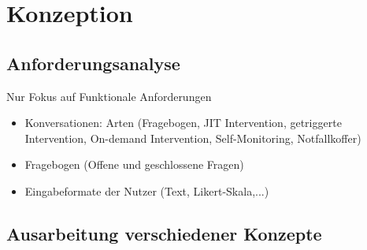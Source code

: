 \chapter{Konzeption}
\label{ch:Design}

\section{Anforderungsanalyse}

Nur Fokus auf Funktionale Anforderungen
\begin{itemize}
\item Konversationen: Arten (Fragebogen, JIT Intervention, getriggerte Intervention, On-demand Intervention, Self-Monitoring, Notfallkoffer)
\item Fragebogen (Offene und geschlossene Fragen)
\item Eingabeformate der Nutzer (Text, Likert-Skala,...)
\end{itemize}

\section{Ausarbeitung verschiedener Konzepte}




